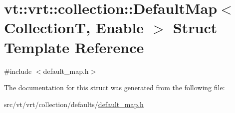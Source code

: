 \hypertarget{structvt_1_1vrt_1_1collection_1_1_default_map}{}\section{vt\+:\+:vrt\+:\+:collection\+:\+:Default\+Map$<$ CollectionT, Enable $>$ Struct Template Reference}
\label{structvt_1_1vrt_1_1collection_1_1_default_map}


{\ttfamily \#include $<$default\+\_\+map.\+h$>$}



The documentation for this struct was generated from the following file\+:\begin{DoxyCompactItemize}
\item 
src/vt/vrt/collection/defaults/\hyperlink{default__map_8h}{default\+\_\+map.\+h}\end{DoxyCompactItemize}
